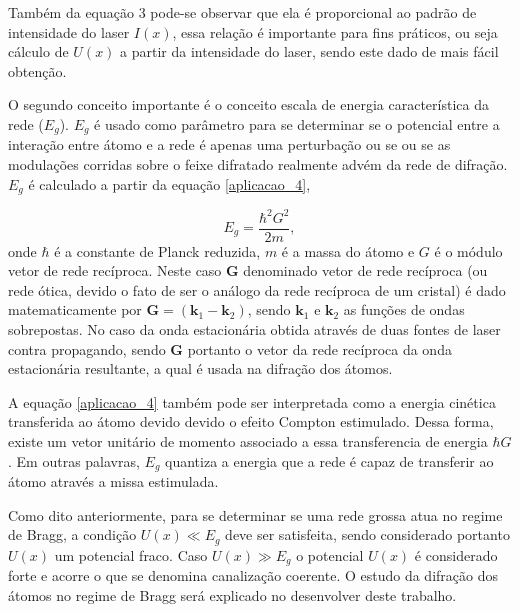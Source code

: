 			\par Também da equação 3 pode-se observar que ela é proporcional ao padrão de intensidade do laser $I(x)$, essa relação é importante para fins práticos, ou seja cálculo de $U(x)$ a partir da intensidade do laser, sendo este dado de mais fácil obtenção.
			
			\par O segundo conceito importante é o conceito escala de energia característica da rede ($E_g$). $E_g$ é usado como parâmetro para se determinar se o potencial entre a interação entre átomo e a rede é apenas uma perturbação ou se ou se as modulações corridas sobre o feixe difratado realmente advém da rede de difração\cite{ricardo_5}. $E_g$ é calculado a partir da equação \eqref{aplicacao_4},

			\begin{equation}
				\label{aplicacao_4}
				E_g = \frac{\hbar^2 G^2}{2m},
			\end{equation}
			onde $\hbar$ é a constante de Planck reduzida, $m$ é a massa do átomo e $G$ é o módulo vetor de rede recíproca. Neste caso $\mathbf{G}$ denominado vetor de rede recíproca (ou rede ótica, devido o fato de ser o análogo da rede recíproca de um cristal) é dado matematicamente por  $\mathbf{G} = (\mathbf{k}_{1} - \mathbf{k}_{2})$, sendo $\mathbf{k}_{1}$ e $\mathbf{k}_{2}$ as funções de ondas sobrepostas. No caso da onda estacionária obtida através de duas fontes de laser contra propagando, sendo $\mathbf{G}$ portanto o vetor da  rede recíproca da onda estacionária resultante, a qual é usada na difração dos átomos\cite{ricardo_5}.
			
			\par A equação \eqref{aplicacao_4} também pode ser interpretada como a energia cinética transferida ao átomo devido devido o efeito Compton estimulado\cite{ricardo_4}. Dessa forma, existe um vetor unitário de momento associado a essa transferencia de energia  $\hbar G$\cite{ricardo_5}. Em outras palavras, $E_{g}$ quantiza a energia que a rede é capaz de transferir ao átomo através a missa estimulada.
			
			Como dito anteriormente, para se determinar se uma rede grossa atua no regime de Bragg, a condição $U(x) \ll E_{g}$ deve ser satisfeita, sendo considerado portanto $U(x)$ um potencial fraco. Caso $U(x) \gg E_{g}$ o potencial $U(x)$ é considerado forte e acorre o que se denomina canalização coerente\cite{ricardo_5}. O estudo da difração dos átomos no regime de Bragg será explicado no desenvolver deste trabalho.


